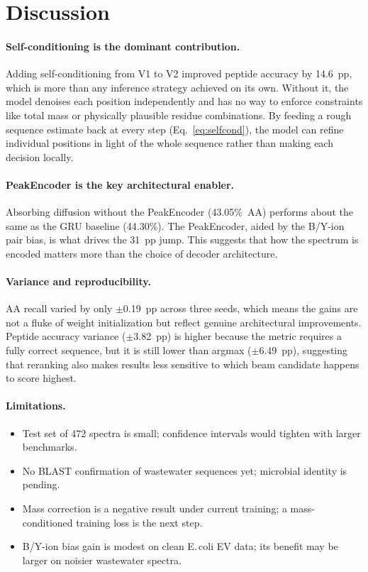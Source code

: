 \documentclass[10pt,twocolumn]{article}
\begin{document}
\section{Discussion}

\paragraph{Self-conditioning is the dominant contribution.}
Adding self-conditioning from V1 to V2 improved peptide accuracy by 14.6~pp, which is more than
any inference strategy achieved on its own.
Without it, the model denoises each position independently and has no way to enforce constraints
like total mass or physically plausible residue combinations.
By feeding a rough sequence estimate back at every step (Eq.~\ref{eq:selfcond}), the model can
refine individual positions in light of the whole sequence rather than making each decision locally.

\paragraph{PeakEncoder is the key architectural enabler.}
Absorbing diffusion without the PeakEncoder (43.05\%~AA) performs about the same as the
GRU baseline (44.30\%).
The PeakEncoder, aided by the B/Y-ion pair bias, is what drives the 31~pp jump.
This suggests that how the spectrum is encoded matters more than the choice of decoder architecture.

\paragraph{Variance and reproducibility.}
AA recall varied by only $\pm$0.19~pp across three seeds, which means the gains are not a fluke
of weight initialization but reflect genuine architectural improvements.
Peptide accuracy variance ($\pm$3.82~pp) is higher because the metric requires a fully correct
sequence, but it is still lower than argmax ($\pm$6.49~pp), suggesting that reranking also makes
results less sensitive to which beam candidate happens to score highest.

\paragraph{Limitations.}
\begin{itemize}[leftmargin=*,itemsep=1pt,topsep=2pt]
\item Test set of 472 spectra is small; confidence intervals would tighten with larger benchmarks.
\item No BLAST confirmation of wastewater sequences yet; microbial identity is pending.
\item Mass correction is a negative result under current training; a mass-conditioned training loss is the next step.
\item B/Y-ion bias gain is modest on clean E.\,coli EV data; its benefit may be larger on noisier wastewater spectra.
\end{itemize}
\end{document}
